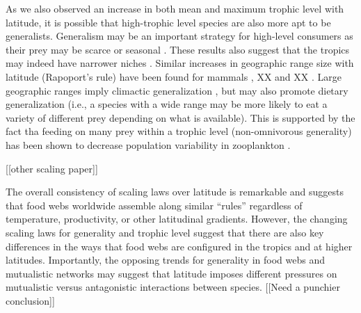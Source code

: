 As we also observed an increase in both mean and maximum trophic level with 
latitude, it is possible that high-trophic level species are also more apt to be generalists. Generalism may be an 
important strategy for high-level consumers as their prey may be scarce or seasonal \citep{}. These results also 
suggest that the tropics may indeed have narrower niches \citep{}. Similar increases in geographic range size with 
latitude (Rapoport's rule) have been found for mammals \citep{Letcher1994}, XX \citep{} and XX \citep{}. Large 
geographic ranges imply climactic generalization \citep{Letcher1994}, but may also promote dietary generalization 
(i.e., a species with a wide range may be more likely to eat a variety of different prey depending on what is 
available). This is supported by the fact tha feeding on many prey within a trophic level (non-omnivorous generality) 
has been shown to decrease population variability in zooplankton \citep{Romanuk2006}.


[[other scaling paper]]


The overall consistency of scaling laws over latitude is remarkable and suggests that food webs worldwide assemble 
along similar ``rules'' regardless of temperature, productivity, or other latitudinal gradients. However, the changing
scaling laws for generality and trophic level suggest that there are also key differences in the ways that food webs 
are configured in the tropics and at higher latitudes. Importantly, the opposing trends for generality in food webs 
and mutualistic networks may suggest that latitude imposes different pressures on mutualistic versus antagonistic 
interactions between species. [[Need a punchier conclusion]]



